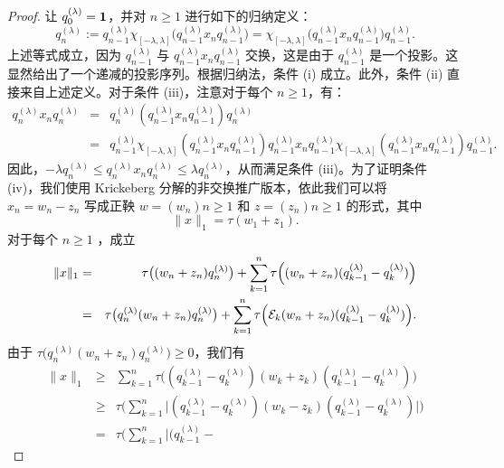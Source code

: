 \begin{proof}
让 $q_{0}^{(\lambda)} = {\bf 1}$，并对 $n \geq 1$ 进行如下的归纳定义：
\[
q_{n}^{(\lambda)} := q_{n-1}^{(\lambda)} \chi_{[-\lambda,\lambda]}
\Big( q_{n-1}^{(\lambda)} x_{n} q_{n-1}^{(\lambda)} \Big) =
\chi_{[-\lambda,\lambda]} \Big( q_{n-1}^{(\lambda)} x_{n}
q_{n-1}^{(\lambda)} \Big) q_{n-1}^{(\lambda)}.\]
上述等式成立，因为 $q_{n-1}^{(\lambda)}$ 与 $q_{n-1}^{(\lambda)} x_{n} q_{n-1}^{(\lambda)}$ 交换，这是由于 $q_{n-1}^{(\lambda)}$ 是一个投影。这显然给出了一个递减的投影序列。根据归纳法，条件 (i) 成立。此外，条件 (ii) 直接来自上述定义。对于条件 (iii)，注意对于每个 $n\geq 1$，有：
\begin{eqnarray*}
q_{n}^{(\lambda)} x_{n} q_{n}^{(\lambda)} & = & q_{n}^{(\lambda)}
(q_{n-1}^{(\lambda)} x_{n} q_{n-1}^{(\lambda)}) q_{n}^{(\lambda)}
\\ & = & q_{n-1}^{(\lambda)} \chi_{[-\lambda,\lambda]}
(q_{n-1}^{(\lambda)} x_{n} q_{n-1}^{(\lambda)})
q_{n-1}^{(\lambda)} x_{n} q_{n-1}^{(\lambda)}
\chi_{[-\lambda,\lambda]} (q_{n-1}^{(\lambda)} x_{n}
q_{n-1}^{(\lambda)}) q_{n-1}^{(\lambda)}.
\end{eqnarray*}
因此，$-\lambda q_{n}^{(\lambda)}\leq q_{n}^{(\lambda)} x_{n}
q_{n}^{(\lambda)}\leq \lambda q_{n}^{(\lambda)}$，从而满足条件 (iii)。为了证明条件 (iv)，我们使用 Krickeberg 分解的非交换推广版本\cite{C}，依此我们可以将 $x_n= w_n - z_n$ 写成正鞅 $w = (w_n){n \ge 1}$ 和 $z = (z_n){n \ge 1}$ 的形式，其中
$$\|x\|_1=\tau(w_1 + z_1).$$ 
对于每个 $n\geq 1$ ，成立
\begin{eqnarray*}
\|x\|_1 & = & \tau \big( (w_n + z_n) q_{n}^{(\lambda)} \big) +
\sum^n_{k=1} \tau \Big( (w_n + z_n) (q_{k-1}^{(\lambda)} -
q_{k}^{(\lambda)}) \Big)
\\ & = & \tau \big( q_{n}^{(\lambda)} (w_n + z_n)
q_n^{(\lambda)} \big) + \sum^n_{k=1} \tau \Big( \mathcal{E}_k (w_n +
z_n) (q_{k-1}^{(\lambda)} - q_{k}^{(\lambda)}) \Big).
\end{eqnarray*}
由于 $\tau \big( q_{n}^{(\lambda)} (w_n + z_n) q_{n}^{(\lambda)})
\geq 0$，我们有
\begin{eqnarray*}
\|x\|_1 & \geq & \sum^{n}_{k=1} \tau \Big( (q_{k-1}^{(\lambda)} -
 q_{k}^{(\lambda)}) (w_k + z_k) (q_{k-1}^{(\lambda)} -
 q_{k}^{(\lambda)}) \Big) \\ & \geq & \tau \Big( \sum^{n}_{k=1}
 \Big| (q_{k-1}^{(\lambda)} - q_{k}^{(\lambda)}) (w_k - z_k)
 (q_{k-1}^{(\lambda)} - q_{k}^{(\lambda)}) \Big| \Big)
\\ & = & \tau \Big( \sum^{n}_{k=1} \Big| (q_{k-1}^{(\lambda)} -

\end{eqnarray*}
\end{proof}
